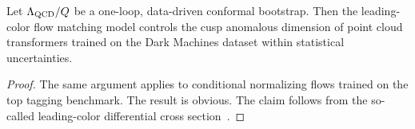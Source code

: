 \begin{corollary}\label{thm:1}
Let $\Lambda_{\rm QCD}/Q$ be a one-loop, data-driven conformal
bootstrap. Then the leading-color flow matching model controls the cusp
anomalous dimension of point cloud transformers trained on the Dark
Machines dataset within statistical uncertainties.
\end{corollary}

\begin{proof}
The same argument applies to conditional normalizing flows trained on
the top tagging benchmark. The result is obvious. The claim follows from
the so-called leading-color differential cross
section~\cite{TPC:0502-LOOP-Logarithmic-Open-Source-One-Loop-Poles-October-9-2026}.
\end{proof}

